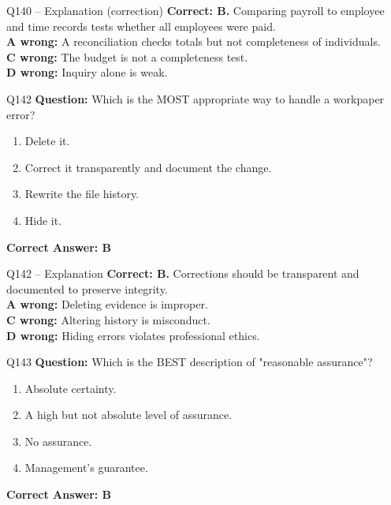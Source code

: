 \documentclass[aspectratio=169,10pt]{beamer}
\begin{document}
	\begin{frame}[t]{Q140 -- Explanation (correction)}
		\small
		\textbf{Correct: B.} Comparing payroll to employee and time records tests whether all employees were paid. \\[4pt]
		\textbf{A wrong:} A reconciliation checks totals but not completeness of individuals. \\[2pt]
		\textbf{C wrong:} The budget is not a completeness test. \\[2pt]
		\textbf{D wrong:} Inquiry alone is weak.
	\end{frame}
	
	\begin{frame}[t]{Q142}
		\small
		\textbf{Question:} Which is the MOST appropriate way to handle a workpaper error?
		\begin{enumerate}[label=\Alph*.,itemsep=1pt,topsep=2pt]
			\item Delete it.
			\item Correct it transparently and document the change.
			\item Rewrite the file history.
			\item Hide it.
		\end{enumerate}
		\vspace{4pt}
		\textbf{Correct Answer: B}
	\end{frame}
	
	\begin{frame}[t]{Q142 -- Explanation}
		\small
		\textbf{Correct: B.} Corrections should be transparent and documented to preserve integrity. \\[4pt]
		\textbf{A wrong:} Deleting evidence is improper. \\[2pt]
		\textbf{C wrong:} Altering history is misconduct. \\[2pt]
		\textbf{D wrong:} Hiding errors violates professional ethics.
	\end{frame}
	
	\begin{frame}[t]{Q143}
		\small
		\textbf{Question:} Which is the BEST description of "reasonable assurance"?
		\begin{enumerate}[label=\Alph*.,itemsep=1pt,topsep=2pt]
			\item Absolute certainty.
			\item A high but not absolute level of assurance.
			\item No assurance.
			\item Management's guarantee.
		\end{enumerate}
		\vspace{4pt}
		\textbf{Correct Answer: B}
	\end{frame}
	
\end{document}
